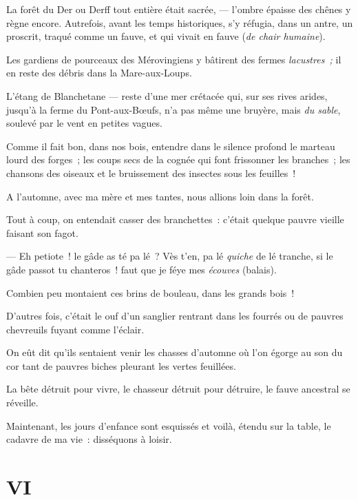 \documentclass[french,twoside]{book} %
\newcommand\chapteropen{} %
\newcommand\chapterclose{} %
\begin{document}
La forêt du Der ou Derff tout entière était sacrée, — l’ombre épaisse des chênes y règne encore. Autrefois, avant les temps historiques, s’y réfugia, dans un antre, un proscrit, traqué comme un fauve, et qui vivait en fauve (\emph{de chair humaine}).\par
Les gardiens de pourceaux des Mérovingiens y bâtirent des fermes \emph{lacustres ;} il en reste des débris dans la Mare-aux-Loups.\par
L’étang de Blanchetane — reste d’une mer crétacée qui, sur ses rives arides, jusqu’à la ferme du Pont-aux-Bœufs, n’a pas même une bruyère, mais \emph{du sable}, soulevé par le vent en petites vagues.\par
Comme il fait bon, dans nos bois, entendre dans le silence profond le marteau lourd des forges ; les coups secs de la cognée qui font frissonner les branches ; les chansons des oiseaux et le bruissement des insectes sous les feuilles !\par
 A l’automne, avec ma mère et mes tantes, nous allions loin dans la forêt.\par
Tout à coup, on entendait casser des branchettes : c’était quelque pauvre vieille faisant son fagot.\par
— Eh petiote ! le gâde as té pa lé ? Vès t’en, pa lé \emph{quiche} de lé tranche, si le gâde passot tu chanteros ! faut que je féye mes \emph{écouves} (balais).\par
Combien peu montaient ces brins de bouleau, dans les grands bois !\par
D’autres fois, c’était le ouf d’un sanglier rentrant dans les fourrés ou de pauvres chevreuils fuyant comme l’éclair.\par
On eût dit qu’ils sentaient venir les chasses d’automne où l’on égorge au son du cor tant de pauvres biches pleurant les vertes feuillées.\par
La bête détruit pour vivre, le chasseur détruit pour détruire, le fauve ancestral se réveille.\par
Maintenant, les jours d’enfance sont esquissés et voilà, étendu sur la table, le cadavre de ma vie : disséquons à loisir.
\chapterclose


\chapteropen
 \chapter[{VI}]{VI}
\label{p1.6}
\end{document}
